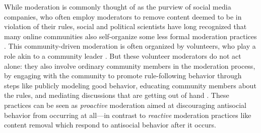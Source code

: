 \documentclass[12pt,letterpaper]{article}
\begin{document}
While moderation is commonly thought of as the purview of social media companies, who often employ moderators to remove content deemed to be in violation of their rules, social and political scientists have long recognized that many online communities also self-organize some less formal moderation practices \cite{grimmelmann_virtues_2015}.
This community-driven moderation is often organized by volunteers, who play a role akin to a community leader \cite{seering_reconsidering_2020}.
But these volunteer moderators do not act alone: they also involve ordinary community members in the moderation process, by engaging with the community to promote rule-following behavior through steps like publicly modeling good behavior, educating community members about the rules, and mediating discussions that are getting out of hand \cite{billings_understanding_2010,seering_shaping_2017}.
These practices can be seen as \emph{proactive} moderation aimed at discouraging antisocial behavior from occurring at all---in contrast to \emph{reactive} moderation practices like content removal which respond to antisocial behavior after it occurs.



\end{document}
